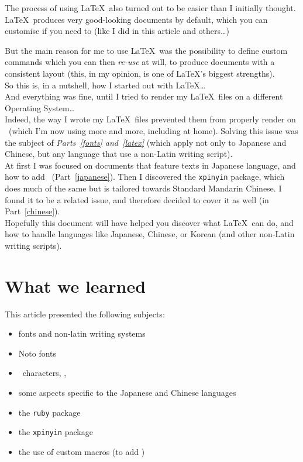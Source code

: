 The process of using \LaTeX\ also turned out to be easier than I initially thought. \LaTeX\ produces very good-looking documents by default, which you can customise if you need to (like I did in this article and others\ldots) 

But the main reason for me to use \LaTeX\ was the possibility to define custom commands which you can then \emph{re-use} at will, to produce documents with a consistent layout (this, in my opinion, is one of \LaTeX's biggest strengths). \\

So this is, in a nutshell, how I started out with \LaTeX\ldots \\

And everything was fine, until I tried to render my \LaTeX\ files on a different Operating System\ldots\ \\

 
Indeed, the way I wrote my \LaTeX\ files prevented them from properly render on \Linux\ (which I'm now using more and more, including at home). 
Solving this issue was the subject of \emph{Parts~\ref{fonts} and~\ref{latex}} (which apply not only to Japanese and Chinese, but any language that use a non-Latin writing script). \\

At first I was focused on documents that feature texts in Japanese language, and how to add \furigana\ (Part~\ref{japanese}). Then I discovered the \texttt{xpinyin} package, which does much of the same but is tailored towards Standard Mandarin Chinese. I found it to be a related issue, and therefore decided to cover it as well (in Part~\ref{chinese}). \\

Hopefully this document will have helped you discover what \LaTeX\ can do, and how to handle languages like Japanese, Chinese, or Korean (and other non-Latin writing scripts).


\section*{What we learned}

This article presented the following subjects:
\begin{itemize}
	\setlength\itemsep{0em}
	\item fonts and non-latin writing systems
	\item Noto fonts
	\item \rruby\ characters, \furigana, \ppinyin
	\item some aspects specific to the Japanese and Chinese languages
	\item the \texttt{ruby} package
	\item the \texttt{xpinyin} package
	\item the use of custom macros (to add \furigana) 
\end{itemize}

\bigskip



